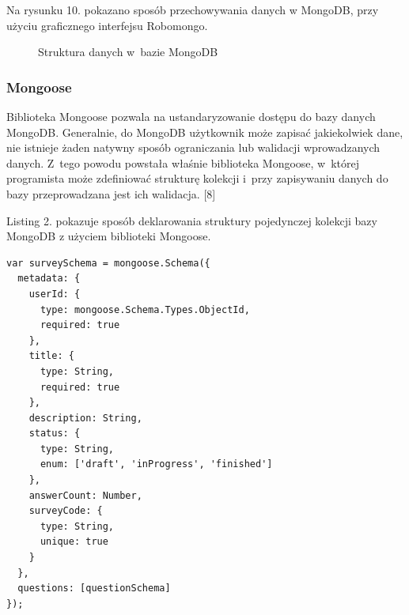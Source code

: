 \documentclass[8pt,a4paper,notitlepage]{article}
\begin{document}
\par Na rysunku 10. pokazano sposób przechowywania danych w MongoDB, przy użyciu graficznego interfejsu Robomongo.

\begin{figure}[H]
\begin{center}
\caption{Struktura danych w~bazie MongoDB}
\end{center}
\end{figure}

\subsubsection{Mongoose}
Biblioteka Mongoose pozwala na ustandaryzowanie dostępu do bazy danych MongoDB. Generalnie, do MongoDB użytkownik może zapisać jakiekolwiek dane, nie istnieje żaden natywny sposób ograniczania lub walidacji wprowadzanych danych. Z~tego powodu powstała właśnie biblioteka Mongoose, w~której programista może zdefiniować strukturę kolekcji i~przy zapisywaniu danych do bazy przeprowadzana jest ich walidacja. [8]
\par Listing 2. pokazuje sposób deklarowania struktury pojedynczej kolekcji bazy MongoDB z użyciem biblioteki Mongoose.

\begin{lstlisting}[caption=Przykład definicji struktury kolekcji w~bibliotece Mongoose ]
var surveySchema = mongoose.Schema({
  metadata: {
    userId: {
      type: mongoose.Schema.Types.ObjectId,
      required: true
    },
    title: {
      type: String,
      required: true
    },
    description: String,
    status: {
      type: String,
      enum: ['draft', 'inProgress', 'finished']
    },
    answerCount: Number,
    surveyCode: {
      type: String,
      unique: true
    }
  },
  questions: [questionSchema]
});
\end{lstlisting}
\end{document}

